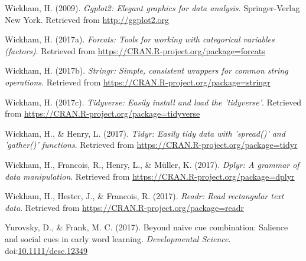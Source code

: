 \documentclass[man]{apa6}
\begin{document}
\hypertarget{ref-R-ggplot2}{}
Wickham, H. (2009). \emph{Ggplot2: Elegant graphics for data analysis}.
Springer-Verlag New York. Retrieved from \url{http://ggplot2.org}

\hypertarget{ref-R-forcats}{}
Wickham, H. (2017a). \emph{Forcats: Tools for working with categorical
variables (factors)}. Retrieved from
\url{https://CRAN.R-project.org/package=forcats}

\hypertarget{ref-R-stringr}{}
Wickham, H. (2017b). \emph{Stringr: Simple, consistent wrappers for
common string operations}. Retrieved from
\url{https://CRAN.R-project.org/package=stringr}

\hypertarget{ref-R-tidyverse}{}
Wickham, H. (2017c). \emph{Tidyverse: Easily install and load the
'tidyverse'}. Retrieved from
\url{https://CRAN.R-project.org/package=tidyverse}

\hypertarget{ref-R-tidyr}{}
Wickham, H., \& Henry, L. (2017). \emph{Tidyr: Easily tidy data with
'spread()' and 'gather()' functions}. Retrieved from
\url{https://CRAN.R-project.org/package=tidyr}

\hypertarget{ref-R-dplyr}{}
Wickham, H., Francois, R., Henry, L., \& Müller, K. (2017). \emph{Dplyr:
A grammar of data manipulation}. Retrieved from
\url{https://CRAN.R-project.org/package=dplyr}

\hypertarget{ref-R-readr}{}
Wickham, H., Hester, J., \& Francois, R. (2017). \emph{Readr: Read
rectangular text data}. Retrieved from
\url{https://CRAN.R-project.org/package=readr}

\hypertarget{ref-yurovsky2017}{}
Yurovsky, D., \& Frank, M. C. (2017). Beyond naive cue combination:
Salience and social cues in early word learning. \emph{Developmental
Science}.
doi:\href{https://doi.org/10.1111/desc.12349}{10.1111/desc.12349}
\end{document}
